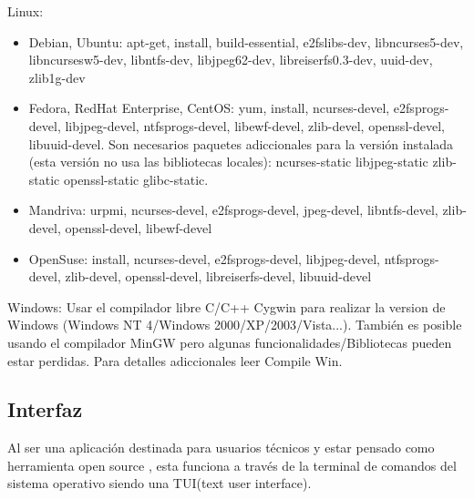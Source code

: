 \documentclass[10pt,a4paper]{article}
\begin{document}
Linux:
\begin{itemize}
\item Debian, Ubuntu: apt-get, install, build-essential, e2fslibs-dev, libncurses5-dev, libncursesw5-dev, libntfs-dev, libjpeg62-dev, libreiserfs0.3-dev, uuid-dev, zlib1g-dev
\item Fedora, RedHat Enterprise, CentOS: yum, install, ncurses-devel, e2fsprogs-devel, libjpeg-devel, ntfsprogs-devel, libewf-devel, zlib-devel, openssl-devel, libuuid-devel. Son necesarios paquetes adiccionales para la versión instalada (esta versión no usa las bibliotecas locales): ncurses-static libjpeg-static zlib-static openssl-static glibc-static.
\item Mandriva: urpmi, ncurses-devel, e2fsprogs-devel, jpeg-devel, libntfs-devel, zlib-devel, openssl-devel, libewf-devel
\item OpenSuse: install, ncurses-devel, e2fsprogs-devel, libjpeg-devel, ntfsprogs-devel, zlib-devel, openssl-devel, libreiserfs-devel, libuuid-devel
\end{itemize}
Windows:
Usar el compilador libre C/C++ Cygwin para realizar la version de Windows (Windows NT 4/Windows 2000/XP/2003/Vista...).
También es posible usando el compilador MinGW pero algunas funcionalidades/Bibliotecas pueden estar perdidas. Para detalles adiccionales leer Compile Win.
\subsection{Interfaz}
Al ser una aplicación destinada para usuarios técnicos y estar pensado como herramienta open source , esta funciona a través de la terminal de comandos del sistema operativo siendo una TUI(text user interface).
\end{document}
